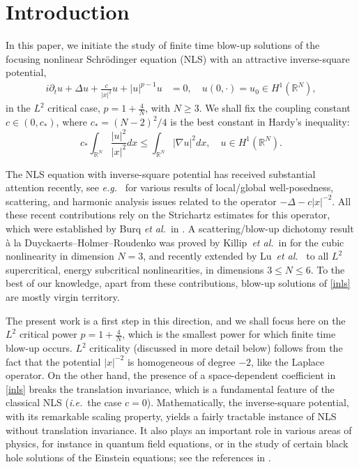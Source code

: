 \documentclass[reqno]{amsart}
\newcommand{\real}{\mathbb{R}}
\newcommand{\rn}{\real^N}
\newcommand{\intrn}{\int_{\real^N}}
\let\le=\leqslant
\let\ge= \geqslant
\theoremstyle{plain}
\theoremstyle{definition}
\numberwithin{equation}{section}
\begin{document}
\maketitle


\section{Introduction}

In this paper, we initiate the study of finite time blow-up solutions of the
focusing nonlinear Schr\"odinger equation (NLS) with an attractive 
inverse-square potential,
\begin{align}\label{inls}
i\partial_t u + \Delta u + \frac{c}{|x|^2}u+|u|^{p-1}u &= 0, \quad
u(0,\cdot)=u_0\in H^1(\rn),
\end{align}
in the $L^2$ critical case, $p=1+\frac{4}{N}$, with $N\ge 3$. 
We shall fix the coupling constant 
$c\in(0,c_*)$, where $c_*=(N-2)^2/4$ is the best constant in Hardy's inequality:
\begin{equation}\label{hardy}
c_*\intrn \frac{|u|^2}{|x|^2}dx \le \intrn |\nabla u|^2 dx, 
\quad u\in H^1(\rn).
\end{equation}


The NLS equation with inverse-square potential has received substantial 
attention recently, see {\em e.g.}~\cite{visan0,visan1,visan2,suzuki,zhang_zheng} for
various results of local/global well-posedness, scattering, and harmonic analysis issues 
related to the operator $-\Delta-c|x|^{-2}$. 
All these recent contributions rely on the Strichartz estimates for this operator, which
were established by Burq {\em et al.}~in \cite{burq}.
A scattering/blow-up dichotomy result \`a la Duyckaerts--Holmer--Roudenko \cite{DHR,HR} was
proved by Killip~{\em et al.}~in \cite{visan2} for the cubic nonlinearity in dimension $N=3$, and 
recently extended by Lu~{\em et al.}~\cite{lu} to all $L^2$ supercritical, energy subcritical
nonlinearities, in dimensions $3\le N \le 6$. To the best of our knowledge, 
apart from these contributions,
blow-up solutions of \eqref{inls} are mostly virgin territory.

The present work is a first step in this direction, and we shall focus here on the 
$L^2$ critical power $p=1+\frac{4}{N}$, which is the smallest power for which finite time blow-up
occurs. $L^2$ criticality (discussed in more detail below) follows from the fact that the
potential $|x|^{-2}$ is homogeneous of degree $-2$, like the Laplace operator. 
On the other hand, the presence of a space-dependent coefficient in \eqref{inls}
breaks the translation invariance, which is a fundamental feature of the classical NLS 
({\em i.e.}~the case $c=0$). 
Mathematically, the inverse-square potential, with its remarkable scaling property, 
yields a fairly tractable instance of NLS without translation invariance. 
It also plays an important role in various areas of physics, for instance in
quantum field equations, or in the study of certain black hole solutions of the Einstein
equations; see the references in \cite{kalf,burq}.
\end{document}
